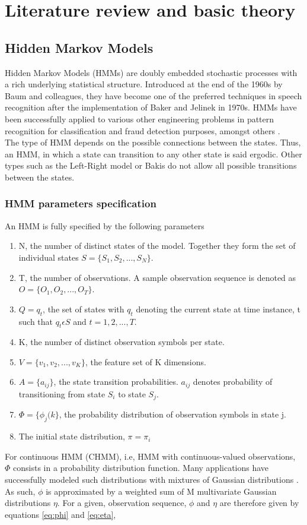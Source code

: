 \chapter{Literature review and basic theory}

\section{Hidden Markov Models}
Hidden Markov Models (HMMs) are doubly embedded stochastic processes with a rich underlying statistical structure. Introduced at the end of the 1960s by Baum and colleagues, they have become one of the preferred techniques in speech recognition after the implementation of Baker and Jelinek in 1970s. HMMs have been successfully applied to various other engineering problems in pattern recognition for classification and fraud detection purposes, amongst others \cite{tuto1989} \cite{tool2001} \cite{towa2009} \cite{twop2008}.\\
The type of HMM depends on the possible connections between the states. Thus, an HMM, in which a state can transition to any other state is said ergodic. Other types such as the Left-Right model or Bakis do not allow all possible transitions between the states.
\subsection{HMM parameters specification}
An HMM is fully specified by the following parameters 
\begin{enumerate}
	\item N, the number of distinct states of the model. Together they form the set of individual states \(S = \{S_1, S_2, ..., S_N\}\).
	\item T, the number of observations. A sample observation sequence is denoted as \(O = \{O_1, O_2, ..., O_T\}\).
	\item \(Q = {q_t}\), the set of states with \(q_t\) denoting the current state at time instance, t such that \(q_t \epsilon S\) and \(t = 1, 2, ..., T\).
	\item K, the number of distinct observation symbols per state. 
	\item \(V = \{v_1, v_2, ..., v_K\}\), the feature set of K dimensions.
	\item \(A =  \{a_{ij} \}\), the state transition probabilities. \(a_{ij}\)  denotes probability of transitioning from state \(S_i\) to state \(S_j\).
	\item \(\Phi =   \{ \phi_{j}(k\}\), the probability distribution of observation symbols in state j.
	\item The initial state distribution, \(\pi = {\pi_i}\)
\end{enumerate}
For continuous HMM (CHMM), i.e, HMM with continuous-valued observations, \(\Phi\) consists in a probability distribution function. Many applications have successfully modeled such distributions with mixtures of Gaussian distributions \cite{cont2013} \cite{ches2012}.
As such, \(\phi\) is approximated by a weighted sum of M multivariate Gaussian distributions \(\eta\). For a given, observation sequence, \(\phi\)  and \(\eta\) are therefore given by equations \ref{eq:phi} and \ref{eq:eta},

